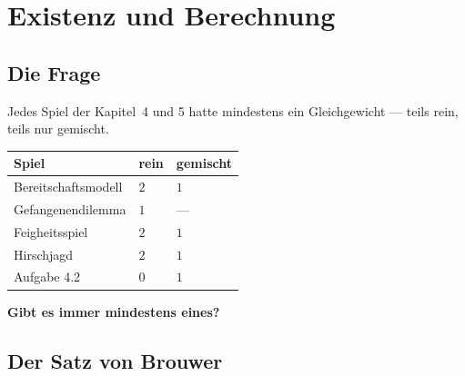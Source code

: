 \chapter{Existenz und Berechnung}

\section{Die Frage}

\begin{merksatz}
Jedes Spiel der Kapitel~4 und 5 hatte mindestens ein Gleichgewicht --- teils rein, teils nur gemischt.

\begin{center}
{\small
\renewcommand{\arraystretch}{1.5}
\begin{tabular}{@{}P{3.4cm}P{1.6cm}P{2.4cm}@{}}
\toprule
\textbf{Spiel} & \textbf{rein} & \textbf{gemischt}\\
\midrule
Bereitschafts\-modell & $2$ & $1$\\
Gefangenen\-dilemma & $1$ & --- \\
Feigheitsspiel & $2$ & $1$\\
Hirschjagd & $2$ & $1$\\
Aufgabe 4.2 & $0$ & $1$\\
\bottomrule
\end{tabular}}
\end{center}

\begin{center}
\begin{minipage}{0.9\textwidth}
\textbf{Gibt es immer mindestens eines?}
\end{minipage}
\end{center}

\begin{center}
\begin{minipage}{0.88\textwidth}
\end{minipage}
\end{center}
\end{merksatz}

\section{Der Satz von Brouwer}

